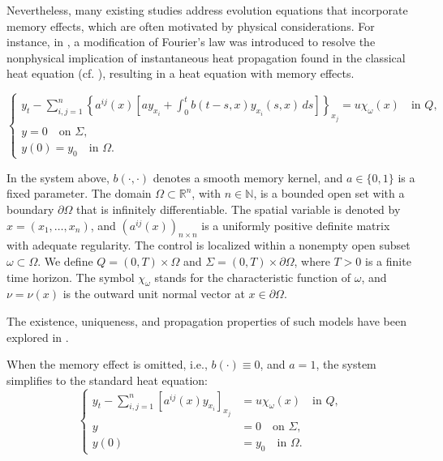 \documentclass[12pt]{article}
\theoremstyle{plain}
\theoremstyle{definition}
\begin{document}
Nevertheless, many existing studies address evolution equations that incorporate memory effects, which are often motivated by physical considerations. For instance, in \cite{gurtin1968general}, a modification of Fourier’s law was introduced to resolve the nonphysical implication of instantaneous heat propagation found in the classical heat equation (cf. \cite{cattaneo1958form}), resulting in a heat equation with memory effects.





\begin{equation}\label{eq:Intro_eq_1}
\left\{
\begin{aligned}
   y_t - \sum_{i,j=1}^{n} \left\{ a^{ij}(x) \left[ a y_{x_i} + \int_0^t b(t-s,x)y_{x_i}(s,x)\,ds \right] \right\}_{x_j} = u\chi_{\omega}(x) \quad \text{in } Q, \\
    y = 0 \quad \text{on } \Sigma, \\
    y(0) = y_0 \quad \text{in } \Omega.
\end{aligned}
\right.
\end{equation}

In the system above, \( b(\cdot,\cdot) \) denotes a smooth memory kernel, and \( a \in \{0,1\} \) is a fixed parameter. The domain \( \Omega \subset \mathbb{R}^n \), with \( n \in \mathbb{N} \), is a bounded open set with a boundary \( \partial \Omega \) that is infinitely differentiable. The spatial variable is denoted by \( x = (x_1, \ldots, x_n) \), and \( (a^{ij}(x))_{n \times n} \) is a uniformly positive definite matrix with adequate regularity. The control is localized within a nonempty open subset \( \omega \subset \Omega \). We define \( Q = (0,T) \times \Omega \) and \( \Sigma = (0,T) \times \partial \Omega \), where \( T > 0 \) is a finite time horizon. The symbol \( \chi_{\omega} \) stands for the characteristic function of \( \omega \), and \( \nu = \nu(x) \) is the outward unit normal vector at \( x \in \partial \Omega \).

The existence, uniqueness, and propagation properties of such models have been explored in \cite{yong2011heat}.

When the memory effect is omitted, i.e., \( b(\cdot) \equiv 0 \), and \( a = 1 \), the system simplifies to the standard heat equation:
\begin{equation}\label{eq:Intro_eq_2}
\left\{
\begin{aligned}
    y_t - \sum_{i,j=1}^{n} \left[ a^{ij}(x)y_{x_i} \right]_{x_j} &= u\chi_{\omega}(x) \quad \text{in } Q, \\
    y &= 0 \quad \text{on } \Sigma, \\
    y(0) &= y_0 \quad \text{in } \Omega.
\end{aligned}
\right.
\end{equation}
\end{document}
